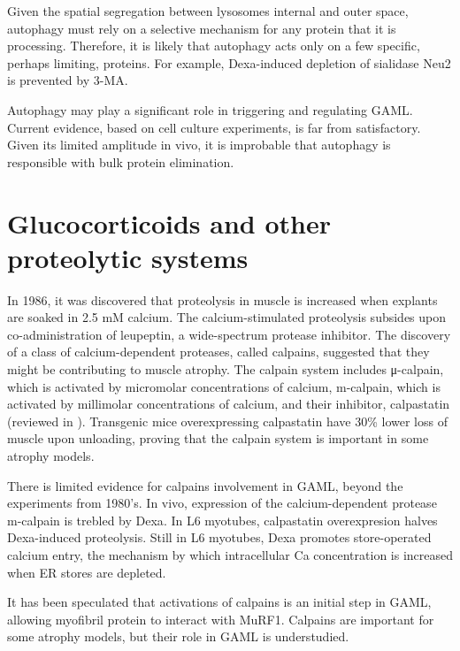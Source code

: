 \documentclass[12pt,english]{report}\usepackage[]{graphicx}\usepackage[]{color}
\begin{document}
Given the spatial segregation between lysosomes internal and outer
space, autophagy must rely on a selective mechanism for any protein
that it is processing. Therefore, it is likely that autophagy acts
only on a few specific, perhaps limiting, proteins. For example, Dexa-induced
depletion of sialidase Neu2 is prevented by 3-MA\citep{rossi2009cytosolic}.

Autophagy may play a significant role in triggering and regulating
GAML. Current evidence, based on cell culture experiments, is far
from satisfactory. Given its limited amplitude in vivo, it is improbable
that autophagy is responsible with bulk protein elimination.


\section{Glucocorticoids and other proteolytic systems}

In 1986, it was discovered that proteolysis in muscle is increased
when explants are soaked in 2.5 mM calcium\citep{rodemann1982stimulation,furuno1986activation}.
The calcium-stimulated proteolysis subsides upon co-administration
of leupeptin, a wide-spectrum protease inhibitor. The discovery of
a class of calcium-dependent proteases, called calpains, suggested
that they might be contributing to muscle atrophy. The calpain system
includes μ-calpain, which is activated by micromolar concentrations
of calcium, m-calpain, which is activated by millimolar concentrations
of calcium, and their inhibitor, calpastatin (reviewed in \citep{kachaeva2012various}).
Transgenic mice overexpressing calpastatin have 30\% lower loss of
muscle upon unloading\citep{tidball2002expression}, proving that
the calpain system is important in some atrophy models.

There is limited evidence for calpains involvement in GAML, beyond
the experiments from 1980's. In vivo, expression of the calcium-dependent
protease m-calpain is trebled by Dexa\citep{dardevet1995sensitivity}.
In L6 myotubes, calpastatin overexpresion halves Dexa-induced proteolysis\citep{fareed2006treatment}.
Still in L6 myotubes, Dexa promotes store-operated calcium entry,
the mechanism by which intracellular Ca concentration is increased
when ER stores are depleted\citep{itagaki2010dexamethasone}.

It has been speculated that activations of calpains is an initial
step in GAML, allowing myofibril protein to interact with MuRF1\citep{goll2003calpain}.
Calpains are important for some atrophy models, but their role in
GAML is understudied.
\end{document}
